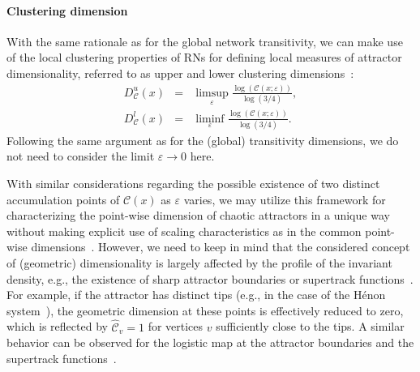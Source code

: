 

		\paragraph{Clustering dimension}\label{sec:transitivity_local}
		With the same rationale as for the global network transitivity, we can make use of the local clustering properties of RNs for defining local measures of attractor dimensionality, referred to as upper and lower clustering dimensions~\cite{Donner2011b}:
\begin{eqnarray}
D_{\mathcal{C}}^u(x) &=& \limsup_{\varepsilon} \frac{\log(\mathcal{C}(x;\varepsilon))}{\log(3/4)}, \\
D_{\mathcal{C}}^l(x) &=& \liminf_{\varepsilon} \frac{\log(\mathcal{C}(x;\varepsilon))}{\log(3/4)}.
\end{eqnarray}
\noindent
Following the same argument as for the (global) transitivity dimensions, we do not need to consider the limit $\varepsilon\to 0$ here.

		With similar considerations regarding the possible existence of two distinct accumulation points of $\mathcal{C}(x)$ as $\varepsilon$ varies, we may utilize this framework for characterizing the point-wise dimension of chaotic attractors in a unique way without making explicit use of scaling characteristics as in the common point-wise dimensions~\cite{Donner2011b}. However, we need to keep in mind that the considered concept of (geometric) dimensionality is largely affected by the profile of the invariant density, e.g., the existence of sharp attractor boundaries or supertrack functions~\cite{Donner2010Nolta,Donner2011b,Donner2010a}. For example, if the attractor has distinct tips (e.g., in the case of the H\'enon system~\cite{Donner2011b,Donner2010a}), the geometric dimension at these points is effectively reduced to zero, which is reflected by $\hat{\mathcal{C}}_v=1$ for vertices $v$ sufficiently close to the tips. A similar behavior can be observed for the logistic map at the attractor boundaries and the supertrack functions~\cite{Donner2010Nolta,Donner2011b,Donner2010a}.

